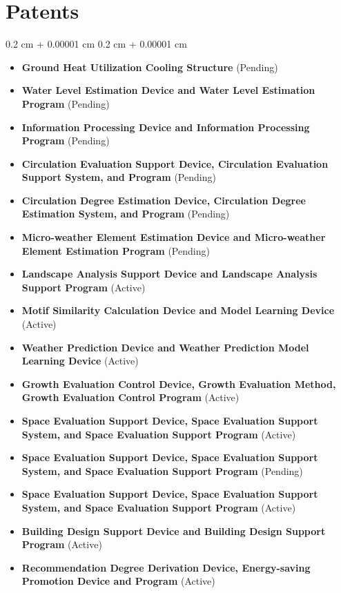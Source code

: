 \documentclass[10pt, letterpaper]{article}
\newenvironment{highlightsforbulletentries}{
    \begin{itemize}[
        topsep=0.10 cm,
        parsep=0.10 cm,
        partopsep=0pt,
        itemsep=0pt,
        leftmargin=10pt
    ]
}{
    \end{itemize}
} %
\newenvironment{onecolentry}{
    \begin{adjustwidth}{
        0.2 cm + 0.00001 cm
    }{
        0.2 cm + 0.00001 cm
    }
}{
    \end{adjustwidth}
} %
\begin{document}
    \section{Patents}

    \begin{onecolentry}
        \begin{highlightsforbulletentries}
            \item \textbf{Ground Heat Utilization Cooling Structure} (Pending)
            \item \textbf{Water Level Estimation Device and Water Level Estimation Program} (Pending)
            \item \textbf{Information Processing Device and Information Processing Program} (Pending)
            \item \textbf{Circulation Evaluation Support Device, Circulation Evaluation Support System, and Program} (Pending)
            \item \textbf{Circulation Degree Estimation Device, Circulation Degree Estimation System, and Program} (Pending)
            \item \textbf{Micro-weather Element Estimation Device and Micro-weather Element Estimation Program} (Pending)
            \item \textbf{Landscape Analysis Support Device and Landscape Analysis Support Program} (Active)
            \item \textbf{Motif Similarity Calculation Device and Model Learning Device} (Active)
            \item \textbf{Weather Prediction Device and Weather Prediction Model Learning Device} (Active)
            \item \textbf{Growth Evaluation Control Device, Growth Evaluation Method, Growth Evaluation Control Program} (Active)
            \item \textbf{Space Evaluation Support Device, Space Evaluation Support System, and Space Evaluation Support Program} (Active)
            \item \textbf{Space Evaluation Support Device, Space Evaluation Support System, and Space Evaluation Support Program} (Pending)
            \item \textbf{Space Evaluation Support Device, Space Evaluation Support System, and Space Evaluation Support Program} (Active)
            \item \textbf{Building Design Support Device and Building Design Support Program} (Active)
            \item \textbf{Recommendation Degree Derivation Device, Energy-saving Promotion Device and Program} (Active)
        \end{highlightsforbulletentries}
    \end{onecolentry}
\end{document}
